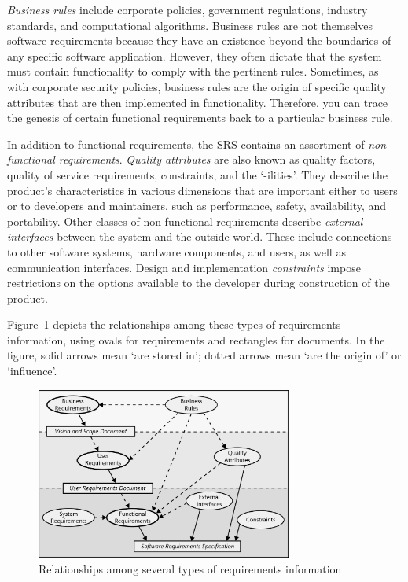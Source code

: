\documentclass[dissertation,final]{softeng}
\begin{document}
\emph{Business rules} include corporate policies, government regulations, industry standards, and computational algorithms. Business rules are not themselves software requirements because they have an existence beyond the boundaries of any specific software application. However, they often dictate that the system must contain functionality to comply with the pertinent rules. Sometimes, as with corporate security policies, business rules are the origin of specific quality attributes that are then implemented in functionality. Therefore, you can trace the genesis of certain functional requirements back to a particular business rule.

In addition to functional requirements, the SRS contains an assortment of \emph{non-functional requirements}. \emph{Quality attributes} are also known as quality factors, quality of service requirements, constraints, and the `-ilities'. They describe the product's characteristics in various dimensions that are important either to users or to developers and maintainers, such as performance, safety, availability, and portability. Other classes of non-functional requirements describe \emph{external interfaces} between the system and the outside world. These include connections to other software systems, hardware components, and users, as well as communication interfaces. Design and implementation \emph{constraints} impose restrictions on the options available to the developer during construction of the product.

Figure~\ref{fig:types_of_requirements} depicts the relationships among these types of requirements information, using ovals for requirements and rectangles for documents. In the figure, solid arrows mean `are stored in'; dotted arrows mean `are the origin of' or `influence'.
\begin{figure}[h!]
\includegraphics[width=0.75\textwidth]{TypesOfRequirements}
\centering
\caption[Types of Requirements]{Relationships among several types of requirements information~\citep[p. 8]{Wiegers2013}}
\label{fig:types_of_requirements}
\end{figure}
\end{document}
